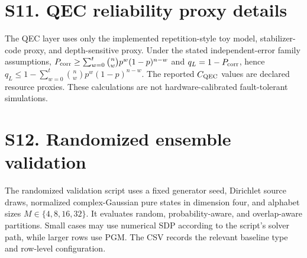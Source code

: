 \documentclass[10pt]{article}
\newcommand{\suppsection}[1]{\section*{#1}}
\begin{document}
\suppsection{S11. QEC reliability proxy details}
The QEC layer uses only the implemented repetition-style toy model, stabilizer-code proxy, and depth-sensitive proxy. Under the stated independent-error family assumptions, $P_{\rm corr}\ge\sum_{w=0}^t\binom nw p^w(1-p)^{n-w}$ and $q_L=1-P_{\rm corr}$, hence $q_L\le1-\sum_{w=0}^t\binom nw p^w(1-p)^{n-w}$. The reported $C_{\rm QEC}$ values are declared resource proxies. These calculations are not hardware-calibrated fault-tolerant simulations.

\suppsection{S12. Randomized ensemble validation}
The randomized validation script uses a fixed generator seed, Dirichlet source draws, normalized complex-Gaussian pure states in dimension four, and alphabet sizes $M\in\{4,8,16,32\}$. It evaluates random, probability-aware, and overlap-aware partitions. Small cases may use numerical SDP according to the script's solver path, while larger rows use PGM. The CSV records the relevant baseline type and row-level configuration.
\end{document}
